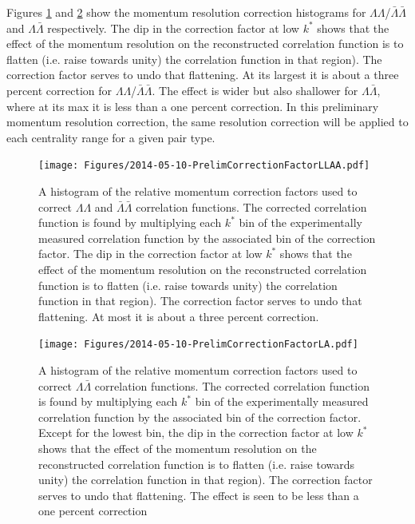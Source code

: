 Figures \ref{fig:MomCorrectionFactorLLAA} and \ref{fig:MomCorrectionFactorLA} show the momentum resolution correction histograms for $\Lambda\Lambda$/$\bar{\Lambda}\bar{\Lambda}$ and $\Lambda\bar{\Lambda}$ respectively.  The dip in the correction factor at low $k^*$ shows that the effect of the momentum resolution on the reconstructed correlation function is to flatten (i.e. raise towards unity) the correlation function in that region).  The correction factor serves to undo that flattening.  At its largest it is about a three percent correction for $\Lambda\Lambda$/$\bar{\Lambda}\bar{\Lambda}$.  The effect is wider but also shallower for $\Lambda\bar{\Lambda}$, where at its max it is less than a one percent correction.  In this preliminary momentum resolution correction, the same resolution correction will be applied to each centrality range for a given pair type.  

\begin{figure}
\texttt{[image: Figures/2014-05-10-PrelimCorrectionFactorLLAA.pdf]}
\caption[Relative momentum correction factor for $\Lambda\Lambda$ and $\bar{\Lambda}\bar{\Lambda}$]{A histogram of the relative momentum correction factors used to correct $\Lambda\Lambda$ and $\bar{\Lambda}\bar{\Lambda}$ correlation functions.  The corrected correlation function is found by multiplying each $k^*$ bin of the experimentally measured correlation function by the associated bin of the correction factor.  The dip in the correction factor at low $k^*$ shows that the effect of the momentum resolution on the reconstructed correlation function is to flatten (i.e. raise towards unity) the correlation function in that region).  The correction factor serves to undo that flattening.  At most it is about a three percent correction.}
\label{fig:MomCorrectionFactorLLAA}
\end{figure}

\begin{figure}
\texttt{[image: Figures/2014-05-10-PrelimCorrectionFactorLA.pdf]}
\caption[Relative momentum correction factor for $\Lambda\bar{\Lambda}$]{A histogram of the relative momentum correction factors used to correct $\Lambda\bar{\Lambda}$ correlation functions.  The corrected correlation function is found by multiplying each $k^*$ bin of the experimentally measured correlation function by the associated bin of the correction factor.  Except for the lowest bin, the dip in the correction factor at low $k^*$ shows that the effect of the momentum resolution on the reconstructed correlation function is to flatten (i.e. raise towards unity) the correlation function in that region).  The correction factor serves to undo that flattening.  The effect is seen to be less than a one percent correction}
\label{fig:MomCorrectionFactorLA}
\end{figure}

